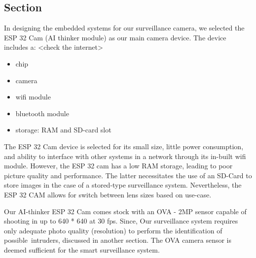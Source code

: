 \documentclass[../../main.tex]{subfiles}
\begin{document}
    \subsection{Section}
        In designing the embedded systems for our surveillance camera, we selected the ESP 32 Cam (AI thinker module) as our main camera device. The device includes a:
        <check the internet>
        \begin{itemize}
            \item chip
            \item camera
            \item wifi module
            \item bluetooth module
            \item storage: RAM and SD-card slot
        \end{itemize}

        The ESP 32 Cam device is selected for its small size, little power consumption, and ability to interface with other systems in a network through its in-built wifi module. However, the ESP 32 cam has a low RAM storage, leading to poor picture quality and performance. The latter necessitates the use of an SD-Card to store images in the case of a stored-type surveillance system. Nevertheless, the ESP 32 CAM allows for switch between lens sizes based on use-case.

        Our AI-thinker ESP 32 Cam comes stock with an OVA - 2MP sensor capable of shooting in up to 640 * 640 at 30 fps. Since, Our surveillance system requires only adequate photo quality (resolution) to perform the identification of possible intruders, discussed in another section. The OVA camera sensor is deemed sufficient for the smart surveillance system.
\end{document}
